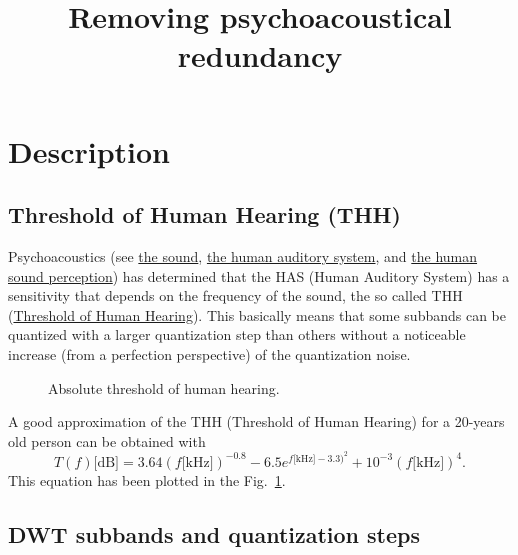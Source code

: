 \title{Removing psychoacoustical redundancy}

\maketitle

\section{Description}

\subsection{Threshold of Human Hearing (THH)}

Psychoacoustics (see
\href{https://vicente-gonzalez-ruiz.github.io/the_sound/}{the sound},
\href{https://vicente-gonzalez-ruiz.github.io/human_auditory_system/}{the
  human auditory system}, and
\href{https://vicente-gonzalez-ruiz.github.io/human_sound_perception/}{the
  human sound perception}) has determined that the HAS (Human Auditory
System) has a sensitivity that depends on the frequency of the sound,
the so called THH
(\href{https://en.wikipedia.org/wiki/Absolute_threshold_of_hearing}{Threshold
  of Human Hearing}). This basically means that some subbands can be
quantized with a larger quantization step than others without a
noticeable increase (from a perfection perspective) of the
quantization noise.

\begin{figure}
  \centering
  \caption{Absolute threshold of human hearing.}
  \label{fig:ToHH}
\end{figure}

A good approximation of the THH (Threshold of Human Hearing) for a 20-years old person can be
obtained with~\cite{bosi2003intro}
\begin{equation}
  T(f)\text{[dB]} = 3.64(f\text{[kHz]})^{-0.8} - 6.5e^{f\text{[kHz]}-3.3)^2} + 10^{-3}(f\text{[kHz]})^4.
  \label{eq:ToHH}
\end{equation}
This equation has been plotted in the Fig.~\ref{fig:ToHH}.

\subsection{DWT subbands and quantization steps}

